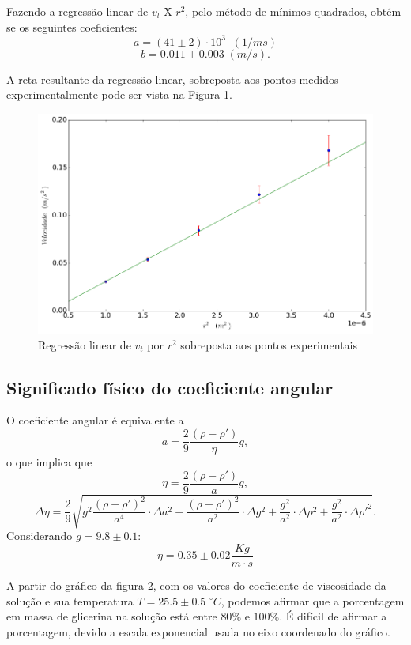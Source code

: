 \documentclass[12pt,a4paper]{article}
\begin{document}
Fazendo a regressão linear de $ v_l$ X $ r^2 $, pelo método de mínimos quadrados, obtém-se os seguintes coeficientes: 
	$$ a = (41 \pm 2) \cdot 10^3  \;\; (1/ms)$$
	$$ b = 0.011 \pm 0.003 \; (m/s).$$

A reta resultante da regressão linear, sobreposta aos pontos medidos experimentalmente pode ser vista na Figura \ref{grafico}.

\begin{figure}
\includegraphics[scale=0.55]{grafico.png}
\caption{Regressão linear de $v_t$ por $r^2$ sobreposta aos pontos experimentais}
\label{grafico}
\end{figure}

\subsection{Significado físico do coeficiente angular}
O coeficiente angular  é equivalente a
$$a = \frac{2}{9} \frac{(\rho - \rho ')}{\eta}g,$$ 
o que implica que 
$$\eta = \frac{2}{9} \frac{(\rho - \rho ')}{a}g,$$
$$\Delta\eta = \frac{2}{9}\sqrt{g^2\frac{(\rho - \rho ')^2}{a^4} \cdot \Delta a^2 + \frac{(\rho - \rho ')^2}{a^2}\cdot \Delta g^2 + \frac{g^2}{a^2} \cdot \Delta \rho ^2 + \frac{g^2}{a^2} \cdot \Delta \rho '^2}. $$
Considerando $ g = 9.8 \pm 0.1 $:
$$\eta = 0.35 \pm 0.02 \dfrac{Kg}{m \cdot s} $$

A partir do gráfico da figura 2, com os valores do coeficiente de viscosidade da solução e sua temperatura $T = 25.5 \pm 0.5$ $^{\circ}C$, podemos afirmar que a porcentagem em massa de glicerina na solução está entre $80 \%$ e $100 \%$. É difícil de afirmar a porcentagem, devido a escala exponencial usada no eixo coordenado do gráfico.
\end{document}
